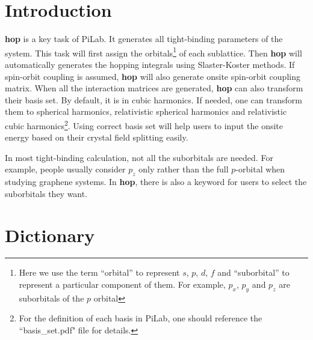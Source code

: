 \documentclass[10pt,a4paper]{article}
\begin{document}
\section{Introduction}


\textbf{hop} is a key task of PiLab. It generates all tight-binding parameters of the system. This task will first assign the orbitals\footnote{Here we use the term ``orbital'' to represent $s$, $p$, $d$, $f$ and ``suborbital'' to represent a particular component of them. For example, $p_{x}$, $p_{y}$ and $p_{z}$ are suborbitals of the $p$ orbital}    of each sublattice. Then \textbf{hop} will automatically generates the hopping integrals using Slaster-Koster methods. If spin-orbit coupling is assumed, \textbf{hop} will also generate onsite spin-orbit coupling matrix. When all the interaction matrices are generated, \textbf{hop} can also transform their basis set. By default, it is in cubic harmonics. If needed, one can transform them to spherical harmonics, relativistic spherical harmonics and relativistic cubic harmonics\footnote{For the definition of each basis in PiLab, one should reference the ``basis\_set.pdf" file for details.}. Using correct basis set will help users to input the onsite energy based on their crystal field splitting easily. 

In most tight-binding calculation, not all the suborbitals are needed. For example, people usually consider $p_{z}$ only rather than the full $p$-orbital when studying graphene systems. In \textbf{hop}, there is also a keyword for users to select the suborbitals they want. 

\section{Dictionary}
\end{document}
